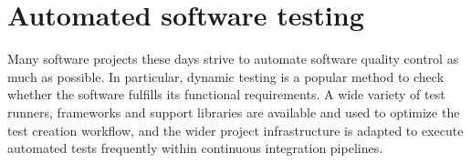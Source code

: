 \chapter{Automated software testing}\label{chap:Testing}
Many software projects these days
strive to automate software quality control
as much as possible.
In particular, dynamic testing
is a popular method to check
whether the software fulfills
its functional requirements.
A wide variety of test runners,
frameworks and support libraries are
available and used to optimize
the test creation workflow,
and the wider project infrastructure
is adapted to execute automated tests frequently
within continuous integration pipelines.












